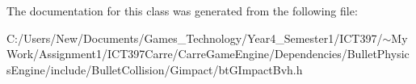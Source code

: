 The documentation for this class was generated from the following file:\begin{CompactItemize}
\item 
C:/Users/New/Documents/Games\_\-Technology/Year4\_\-Semester1/ICT397/$\sim$My Work/Assignment1/ICT397Carre/CarreGameEngine/Dependencies/BulletPhysicsEngine/include/BulletCollision/Gimpact/btGImpactBvh.h\end{CompactItemize}
